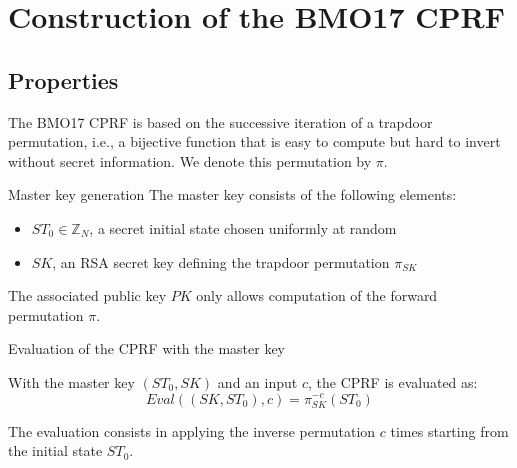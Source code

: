\documentclass[9pt]{extarticle}
\begin{document}
\section{Construction of the BMO17 CPRF}

\subsection{Properties}

The BMO17 CPRF is based on the successive iteration of a trapdoor permutation,
i.e., a bijective function that is easy to compute but hard to invert without secret information.
We denote this permutation by $\pi$.

\begin{defbox}{Master key generation}
The master key consists of the following elements:
\begin{itemize}
  \item $ST_0 \in \mathbb{Z}_N$, a secret initial state chosen uniformly at random
  \item $SK$, an RSA secret key defining the trapdoor permutation $\pi_{SK}$
\end{itemize}
The associated public key $PK$ only allows computation of the forward permutation $\pi$.
\end{defbox}

\begin{defbox}{Evaluation of the CPRF with the master key}
    
With the master key $(ST_0, SK)$ and an input $c$, the CPRF is evaluated as:
\[
Eval((SK, ST_0), c) = \pi_{SK}^{-c}(ST_0)
\]

The evaluation consists in applying the inverse permutation $c$ times starting from the initial state $ST_0$.

\begin{center}
\end{center}

\end{defbox}
\end{document}
